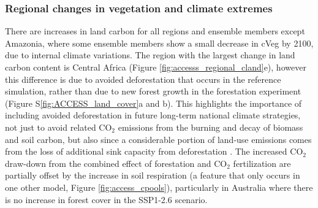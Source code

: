 \documentclass[]{article}
\begin{document}

\subsubsection{Regional changes in vegetation and climate extremes}

There are increases in land carbon for all regions and ensemble members except Amazonia, where some ensemble members show a small decrease in cVeg by 2100, due to internal climate variations.
The region with the largest change in land carbon content is Central Africa (Figure \ref{fig:accesss_regional_cland}e), however this difference is due to avoided deforestation that occurs in the reference simulation, rather than due to new forest growth in the forestation experiment (Figure S\ref{fig:ACCESS_land_cover}a and b).
This highlights the importance of including avoided deforestation in future long-term national climate strategies, not just to avoid related CO$_2$ emissions from the burning and decay of biomass and soil carbon, but also since a considerable portion of land-use emissions comes from the loss of additional sink capacity from deforestation \parencite{gitz_amplifying_2003, pongratz_terminology_2014, obermeier_modelled_2021}.
The increased CO$_2$ draw-down from the combined effect of forestation and CO$_2$ fertilization are partially offset by the increase in soil respiration (a feature that only occurs in one other model, Figure \ref{fig:access_cpools}), particularly in Australia where there is no increase in forest cover in the SSP1-2.6 scenario.
\end{document}
